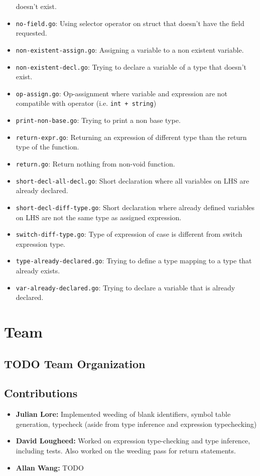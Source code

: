 \documentclass[11pt]{article}
\begin{document}
\begin{itemize}
doesn't exist.
\item \texttt{no-field.go}: Using selector operator on struct that doesn't have
the field requested.
\item \texttt{non-existent-assign.go}: Assigning a variable to a non existent
variable.
\item \texttt{non-existent-decl.go}: Trying to declare a variable of a type that
doesn't exist.
\item \texttt{op-assign.go}: Op-assignment where variable and expression are not
compatible with operator (i.e. \texttt{int + string})
\item \texttt{print-non-base.go}: Trying to print a non base type.
\item \texttt{return-expr.go}: Returning an expression of different type than the
return type of the function.
\item \texttt{return.go}: Return nothing from non-void function.
\item \texttt{short-decl-all-decl.go}: Short declaration where all variables on
LHS are already declared.
\item \texttt{short-decl-diff-type.go}: Short declaration where already defined
variables on LHS are not the same type as assigned expression.
\item \texttt{switch-diff-type.go}: Type of expression of case is different from
switch expression type.
\item \texttt{type-already-declared.go}: Trying to define a type mapping to a
type that already exists.
\item \texttt{var-already-declared.go}: Trying to declare a variable that is
already declared.
\end{itemize}
\section{Team}
\label{sec:org3d6a272}
\subsection{{\bfseries\sffamily TODO} Team Organization}
\label{sec:org8b263a8}
\subsection{Contributions}
\label{sec:org0725b0c}
\begin{itemize}
\item \textbf{Julian Lore:} Implemented weeding of blank identifiers, symbol
table generation, typecheck (aside from type inference and
expression typechecking)
\item \textbf{David Lougheed:} Worked on expression type-checking and type inference,
including tests. Also worked on the weeding pass for return
statements.
\item \textbf{Allan Wang:} TODO
\end{itemize}
\end{document}
